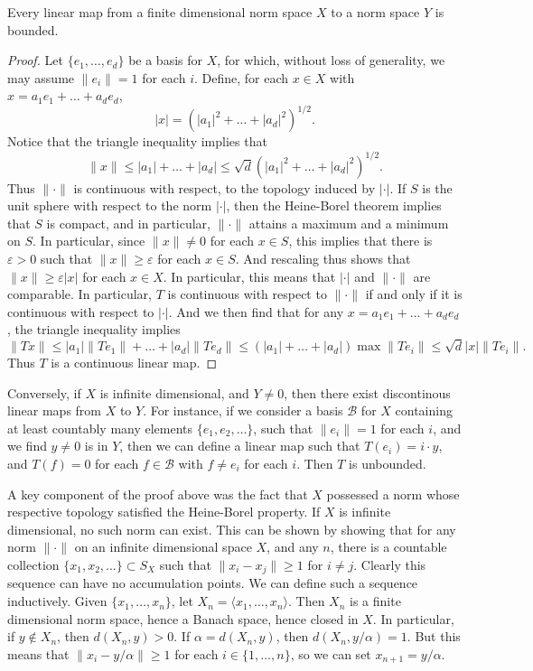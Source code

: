 \begin{theorem}
    Every linear map from a finite dimensional norm space $X$ to a norm space $Y$ is bounded.
\end{theorem}
\begin{proof}
    Let $\{ e_1, \dots, e_d \}$ be a basis for $X$, for which, without loss of generality, we may assume $\| e_i \| = 1$ for each $i$. Define, for each $x \in X$ with $x = a_1e_1 + \dots + a_d e_d$,
    \[ |x| = (|a_1|^2 + \dots + |a_d|^2)^{1/2}. \]
    Notice that the triangle inequality implies that
    \[ \| x \| \leq |a_1| + \dots + |a_d| \leq \sqrt{d} \left( |a_1|^2 + \dots + |a_d|^2 \right)^{1/2}. \]
    Thus $\| \cdot \|$ is continuous with respect, to the topology induced by $|\cdot|$. If $S$ is the unit sphere with respect to the norm $|\cdot|$, then the Heine-Borel theorem implies that $S$ is compact, and in particular, $\| \cdot \|$ attains a maximum and a minimum on $S$. In particular, since $\| x \| \neq 0$ for each $x \in S$, this implies that there is $\varepsilon > 0$ such that $\| x \| \geq \varepsilon$ for each $x \in S$. And rescaling thus shows that $\| x \| \geq \varepsilon |x|$ for each $x \in X$. In particular, this means that $|\cdot|$ and $\| \cdot \|$ are comparable. In particular, $T$ is continuous with respect to $\| \cdot \|$ if and only if it is continuous with respect to $| \cdot |$. And we then find that for any $x = a_1e_1 + \dots + a_de_d$, the triangle inequality implies
    \[ \| Tx \| \leq |a_1| \| Te_1 \| + \dots + |a_d| \| Te_d \| \leq (|a_1| + \dots + |a_d|) \max \| Te_i \| \leq \sqrt{d} |x| \| Te_i \|. \]
    Thus $T$ is a continuous linear map.
\end{proof}

Conversely, if $X$ is infinite dimensional, and $Y \neq 0$, then there exist discontinous linear maps from $X$ to $Y$. For instance, if we consider a basis $\mathcal{B}$ for $X$ containing at least countably many elements $\{ e_1, e_2, \dots \}$, such that $\| e_i \| = 1$ for each $i$, and we find $y \neq 0$ is in $Y$, then we can define a linear map such that $T(e_i) = i \cdot y$, and $T(f) = 0$ for each $f \in \mathcal{B}$ with $f \neq e_i$ for each $i$. Then $T$ is unbounded.

\begin{remark}
    A key component of the proof above was the fact that $X$ possessed a norm whose respective topology satisfied the Heine-Borel property. If $X$ is infinite dimensional, no such norm can exist. This can be shown by showing that for any norm $\| \cdot \|$ on an infinite dimensional space $X$, and any $n$, there is a countable collection $\{ x_1, x_2, \dots \} \subset S_X$ such that $\| x_i - x_j \| \geq 1$ for $i \neq j$. Clearly this sequence can have no accumulation points. We can define such a sequence inductively. Given $\{ x_1, \dots, x_n \}$, let $X_n = \langle x_1, \dots, x_n \rangle$. Then $X_n$ is a finite dimensional norm space, hence a Banach space, hence closed in $X$. In particular, if $y \not \in X_n$, then $d(X_n,y) > 0$. If $\alpha = d(X_n,y)$, then $d(X_n,y/\alpha) = 1$. But this means that $\| x_i - y/\alpha \| \geq 1$ for each $i \in \{ 1, \dots, n \}$, so we can set $x_{n+1} = y/\alpha$.
\end{remark}

